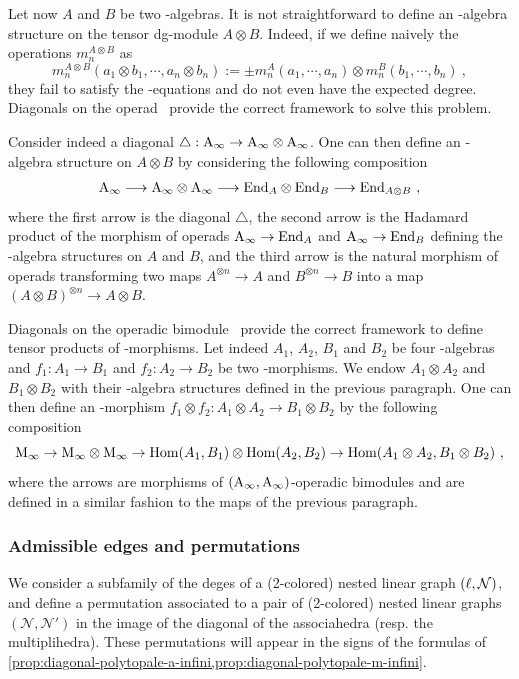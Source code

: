 \documentclass[twoside, 12pt]{amsart}
\theoremstyle{remark}
\begin{document}
Let now $A$ and $B$ be two \Ainf -algebras. It is not straightforward to define an \Ainf -algebra structure on the tensor dg-module $A \otimes B$. Indeed, if we define naively the operations $m_n^{A \otimes B}$ as \[ m_n^{A \otimes B}(a_1 \otimes b_1 , \cdots , a_n \otimes b_n) := \pm m_n^A(a_1 , \cdots , a_n) \otimes m_n^B (b_1 , \cdots , b_n) \ , \]
they fail to satisfy the \Ainf -equations and do not even have the expected degree.
Diagonals on the operad \Ainf\ provide the correct framework to solve this problem.

Consider indeed a diagonal $\triangle : \mathrm{A}_\infty \rightarrow \mathrm{A}_\infty \otimes \mathrm{A}_\infty$. One can then define an \Ainf -algebra structure on $A \otimes B$ by considering the following composition
\[ \mathrm{A}_\infty \longrightarrow \mathrm{A}_\infty \otimes \mathrm{A}_\infty \longrightarrow \mathrm{End}_A \otimes \mathrm{End}_B \longrightarrow \mathrm{End}_{A \otimes B} \ , \]
where the first arrow is the diagonal $\triangle$, the second arrow is the Hadamard product of the morphism of operads $\mathrm{A}_\infty \rightarrow \mathrm{End}_A$ and $\mathrm{A}_\infty \rightarrow \mathrm{End}_B$ defining the \Ainf -algebra structures on $A$ and $B$, and the third arrow is the natural morphism of operads transforming two maps $A^{\otimes n} \rightarrow A$ and $B^{\otimes n} \rightarrow B$ into a map $(A\otimes B)^{\otimes n} \rightarrow A \otimes B$.

Diagonals on the operadic bimodule \Minf\ provide the correct framework to define tensor products of \Ainf -morphisms. Let indeed $A_1$, $A_2$, $B_1$ and $B_2$ be four \Ainf -algebras and $f_1 : A_1 \rightarrow B_1$ and $f_2 : A_2 \rightarrow B_2$ be two \Ainf -morphisms. We endow $A_1 \otimes A_2$ and $B_1 \otimes B_2$ with their \Ainf -algebra structures defined in the previous paragraph. 
One can then define an \Ainf -morphism $f_1 \otimes f_2 : A_1 \otimes A_2 \rightarrow B_1 \otimes B_2$ by the following composition
\[ \Minf \rightarrow \Minf \otimes \Minf \rightarrow \Hom (A_1 , B_1) \otimes \Hom (A_2,B_2) \rightarrow  \Hom (A_1 \otimes A_2 , B_1 \otimes B_2) \ , \]
where the arrows are morphisms of $(\mathrm{A}_\infty , \mathrm{A}_\infty )$-operadic bimodules and are defined in a similar fashion to the maps of the previous paragraph.

\subsubsection{Admissible edges and permutations}
We consider a subfamily of the deges of a (2-colored) nested linear graph $(\ell,\mathcal{N})$, and define a permutation associated to a pair of (2-colored) nested linear graphs $(\mathcal{N},\mathcal{N}')$ in the image of the diagonal of the associahedra (resp. the multiplihedra). 
These permutations will appear in the signs of the formulas of \cref{prop:diagonal-polytopale-a-infini,prop:diagonal-polytopale-m-infini}.
\end{document}
